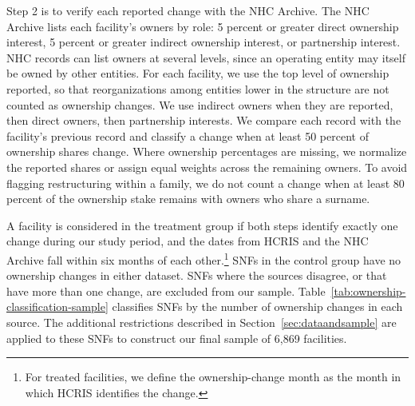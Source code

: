 \documentclass[12pt]{article}
\begin{document}
Step 2 is to verify each reported change with the NHC Archive. The NHC Archive lists each facility's owners by role: 5 percent or greater direct ownership interest, 5 percent or greater indirect ownership interest, or partnership interest. NHC records can list owners at several levels, since an operating entity may itself be owned by other entities. For each facility, we use the top level of ownership reported, so that reorganizations among entities lower in the structure are not counted as ownership changes. We use indirect owners when they are reported, then direct owners, then partnership interests. We compare each record with the facility's previous record and classify a change when at least 50 percent of ownership shares change. Where ownership percentages are missing, we normalize the reported shares or assign equal weights across the remaining owners. To avoid flagging restructuring within a family, we do not count a change when at least 80 percent of the ownership stake remains with owners who share a surname.

A facility is considered in the treatment group if both steps identify exactly one change during our study period, and the dates from HCRIS and the NHC Archive fall within six months of each other.\footnote{For treated facilities, we define the ownership-change month as the month in which HCRIS identifies the change.} SNFs in the control group have no ownership changes in either dataset. SNFs where the sources disagree, or that have more than one change, are excluded from our sample. Table~\ref{tab:ownership-classification-sample} classifies SNFs by the number of ownership changes in each source. The additional restrictions described in Section~\ref{sec:dataandsample} are applied to these SNFs to construct our final sample of 6,869 facilities.
\end{document}
